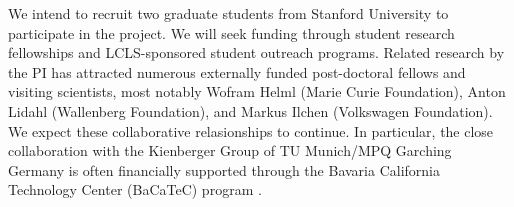 We intend to recruit two graduate students from Stanford University to participate in the project.
We will seek funding through student research fellowships and LCLS-sponsored student outreach programs.
Related research by the PI has attracted numerous externally funded post-doctoral fellows and visiting scientists, most notably Wofram Helml (Marie Curie Foundation), Anton Lidahl (Wallenberg Foundation), and Markus Ilchen (Volkswagen Foundation).
We expect these collaborative relasionships to continue.
In particular, the close collaboration with the Kienberger Group of TU Munich/MPQ Garching Germany is often financially supported through the Bavaria California Technology Center (BaCaTeC) program \cite{BaCaTeC}.
